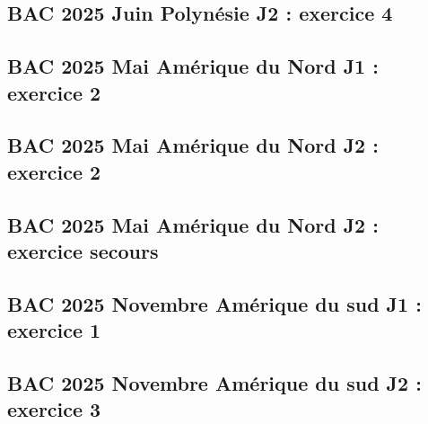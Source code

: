 \documentclass[lang=fr,edition=teacher,layout=sheet]{mxbook}
\begin{document}
\begingroup\endgroup
\par\bigskip
{}\subsection*{BAC 2025 Juin Polynésie J2 : exercice 4}
\begingroup\endgroup
\par\bigskip
{}\subsection*{BAC 2025 Mai Amérique du Nord J1 : exercice 2}
\begingroup\endgroup
\par\bigskip
{}\subsection*{BAC 2025 Mai Amérique du Nord J2 : exercice 2}
\begingroup\endgroup
\par\bigskip
{}\subsection*{BAC 2025 Mai Amérique du Nord J2 : exercice secours}
\begingroup\endgroup
\par\bigskip
{}\subsection*{BAC 2025 Novembre Amérique du sud J1 : exercice 1}
\begingroup\endgroup
\par\bigskip
{}\subsection*{BAC 2025 Novembre Amérique du sud J2 : exercice 3}
\begingroup\endgroup
\par\bigskip
\end{document}
